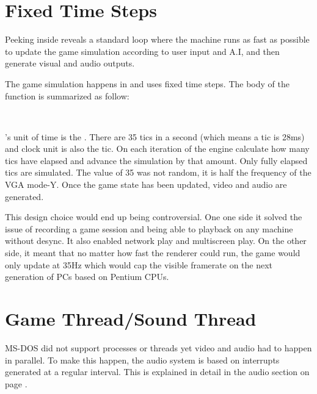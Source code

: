 \section{Fixed Time Steps}
Peeking inside  reveals a standard loop where the machine runs as fast as possible to update the game simulation according to user input and A.I, and then generate visual and audio outputs.\\
\par
{}
The game simulation happens in  and uses fixed time steps. The body of the function is summarized as follow:\\
\par
{}\label{TryRunTics.c}\\
\par
\doom's unit of time is the . There are 35 tics in a second (which means a tic is 28ms) and 
 clock unit is also the tic. On each iteration of  the engine calculate how many tics have elapsed and advance the simulation by that amount. Only fully elapsed tics are simulated. The value of 35 was not random, it is half the frequency of the VGA mode-Y. Once the game state has been updated, video and audio are generated.\\
\par
{}
\par
This design choice would end up being controversial. One one side it solved the issue of recording a game session and being able to playback on any machine without desync. It also enabled network play and multiscreen play. On the other side, it meant that no matter how fast the renderer could run, the game would only update at 35Hz which would cap the visible framerate on the next generation of PCs based on Pentium CPUs.\\
\par



\section{Game Thread/Sound Thread}
MS-DOS did not support processes or threads yet video and audio had to happen in parallel. To make this happen, the audio system is based on interrupts generated at a regular interval. This is explained in detail in the audio section on page \pageref{dmx_section}.\\







